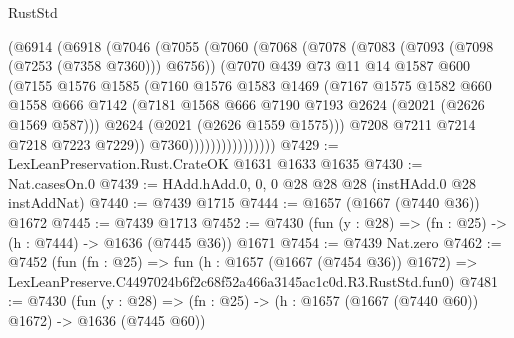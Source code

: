 \begin{lexlean}{RustStd}
\begin{coremodule}
                    (@6914
                      (@6918
                        (@7046
                          (@7055
                            (@7060
                              (@7068
                                (@7078
                                  (@7083 (@7093 (@7098 (@7253 (@7358 @7360))) @6756))
                                  (@7070
                                    @439
                                    @73
                                    @11
                                    @14
                                    @1587
                                    @600
                                    (@7155
                                      @1576
                                      @1585
                                      (@7160
                                        @1576
                                        @1583
                                        @1469
                                        (@7167
                                          @1575
                                          @1582
                                          @660
                                          @1558
                                          @666
                                          @7142
                                          (@7181
                                            @1568
                                            @666
                                            @7190
                                            @7193
                                            @2624
                                            (@2021 (@2626 @1569 @587)))
                                          @2624
                                          (@2021 (@2626 @1559 @1575)))
                                        @7208
                                        @7211
                                        @7214
                                        @7218
                                        @7223
                                        @7229))
                                    @7360))))))))))))))))
@7429 := LexLeanPreservation.Rust.CrateOK @1631 @1633 @1635
@7430 := Nat.casesOn.{0}
@7439 := HAdd.hAdd.{0, 0, 0} @28 @28 @28 (instHAdd.{0} @28 instAddNat)
@7440 := @7439 @1715
@7444 := @1657 (@1667 (@7440 @36)) @1672
@7445 := @7439 @1713
@7452 := @7430 (fun (y : @28) => (fn : @25) -> (h : @7444) -> @1636 (@7445 @36)) @1671
@7454 := @7439 Nat.zero
@7462 := @7452
    (fun (fn : @25) =>
    fun (h : @1657 (@1667 (@7454 @36)) @1672) =>
    LexLeanPreserve.C4497024b6f2c68f52a466a3145ac1c0d.R3.RustStd.fun0)
@7481 := @7430
    (fun (y : @28) => (fn : @25) -> (h : @1657 (@1667 (@7440 @60)) @1672) -> @1636 (@7445 @60))

\end{coremodule}
\end{lexlean}
